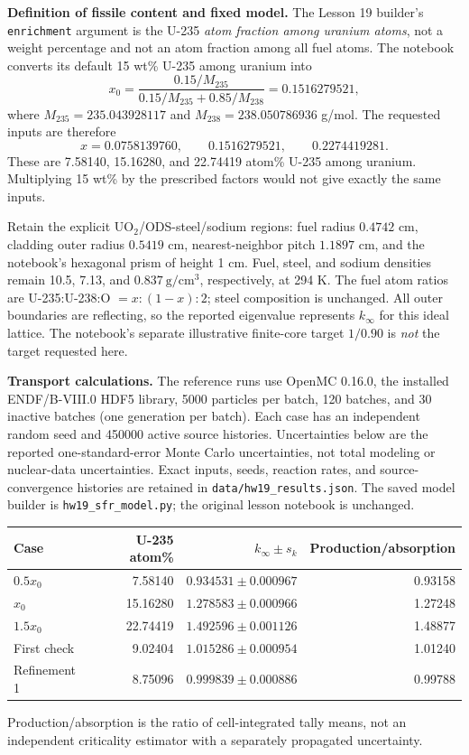 \begin{draftsolution}

\textbf{Definition of fissile content and fixed model.}
The Lesson 19 builder's \texttt{enrichment} argument is the U-235
\emph{atom fraction among uranium atoms}, not a weight percentage and not
an atom fraction among all fuel atoms. The notebook converts its default
15 wt\% U-235 among uranium into
\[
 x_0=\frac{0.15/M_{235}}{0.15/M_{235}+0.85/M_{238}}
 =0.1516279521,
\]
where $M_{235}=235.043928117$ and $M_{238}=238.050786936$ g/mol.
The requested inputs are therefore
\[
 x=0.0758139760,\qquad0.1516279521,\qquad0.2274419281.
\]
These are 7.58140, 15.16280, and 22.74419 atom\% U-235 among uranium.
Multiplying 15 wt\% by the prescribed factors would not give exactly the
same inputs.

Retain the explicit UO$_2$/ODS-steel/sodium regions: fuel radius
$0.4742$ cm, cladding outer radius $0.5419$ cm, nearest-neighbor pitch
$1.1897$ cm, and the notebook's hexagonal prism of height 1 cm.
Fuel, steel, and sodium densities remain 10.5, 7.13, and
$0.837~\mathrm{g/cm^3}$, respectively, at 294 K. The fuel atom ratios are
U-235:U-238:O $=x:(1-x):2$; steel composition is unchanged.
All outer boundaries are reflecting, so the reported eigenvalue represents
$k_\infty$ for this ideal lattice. The notebook's separate illustrative
finite-core target $1/0.90$ is \emph{not} the target requested here.

\textbf{Transport calculations.}
The reference runs use OpenMC 0.16.0, the installed ENDF/B-VIII.0 HDF5
library, 5000 particles per batch, 120 batches, and 30 inactive batches
(one generation per batch). Each case has an independent random seed and
450000 active source histories. Uncertainties below are the reported
one-standard-error Monte Carlo uncertainties, not total modeling or
nuclear-data uncertainties. Exact inputs, seeds, reaction rates, and
source-convergence histories are retained in
\texttt{data/hw19\_results.json}. The saved model builder is
\texttt{hw19\_sfr\_model.py}; the original lesson notebook is unchanged.

\begin{center}
\begin{tabular}{lrrr}
\hline
Case & U-235 atom\% & $k_\infty\pm s_k$ & Production/absorption \\
\hline
$0.5x_0$ & 7.58140 & $0.934531\pm0.000967$ & 0.93158 \\
$x_0$ & 15.16280 & $1.278583\pm0.000966$ & 1.27248 \\
$1.5x_0$ & 22.74419 & $1.492596\pm0.001126$ & 1.48877 \\
First check & 9.02404 & $1.015286\pm0.000954$ & 1.01240 \\
Refinement 1 & 8.75096 & $0.999839\pm0.000886$ & 0.99788 \\
\hline
\end{tabular}
\end{center}
Production/absorption is the ratio of cell-integrated tally means, not an
independent criticality estimator with a separately propagated uncertainty.


\end{draftsolution}
